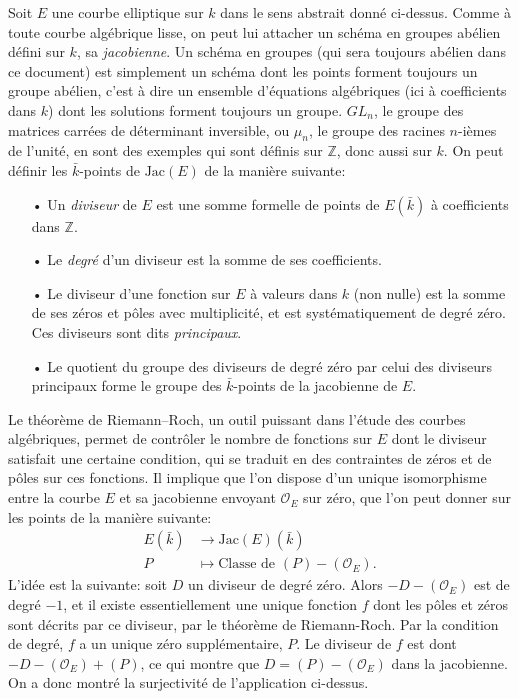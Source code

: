 \documentclass[11pt,a4paper]{article}
\newcommand{\Z}{\mathbb{Z}}
\renewcommand{\O}{\mathcal{O}}
\newcommand{\vers}{\longrightarrow}
\newcommand{\Jac}{\mathrm{Jac}}
\theoremstyle{definition}
\begin{document}
Soit $E$ une courbe elliptique sur $k$ dans le sens abstrait donné ci-dessus. Comme à toute courbe algébrique lisse, on peut lui attacher un schéma en groupes abélien défini sur $k$, sa \emph{jacobienne}. Un schéma en groupes (qui sera toujours abélien dans ce document) est simplement un schéma dont les points forment toujours un groupe abélien, c'est à dire un ensemble d'équations algébriques (ici à coefficients dans $k$) dont les solutions forment toujours un groupe. $GL_n$, le groupe des matrices carrées de déterminant inversible, ou $\mu_n$, le groupe des racines $n$-ièmes de l'unité, en sont des exemples qui sont définis sur $\Z$, donc aussi sur $k$. On peut définir les $\bar{k}$-points de $\Jac(E)$ de la manière suivante:
\begin{itemize}
\item[•] Un \emph{diviseur} de $E$ est une somme formelle de points de $E(\bar{k})$ à coefficients dans $\Z$.
\item[•] Le \emph{degré} d'un diviseur est la somme de ses coefficients.
\item[•] Le diviseur d'une fonction sur $E$ à valeurs dans $k$ (non nulle) est la somme de ses zéros et pôles avec multiplicité, et est systématiquement de degré zéro. Ces diviseurs sont dits \emph{principaux}.
\item[•] Le quotient du groupe des diviseurs de degré zéro par celui des diviseurs principaux forme le groupe des $\bar{k}$-points de la jacobienne de $E$.
\end{itemize}
Le théorème de Riemann--Roch, un outil puissant dans l'étude des courbes algébriques, permet de contrôler le nombre de fonctions sur $E$ dont le diviseur satisfait une certaine condition, qui se traduit en des contraintes de zéros et de pôles sur ces fonctions. Il implique que l'on dispose d'un unique isomorphisme entre la courbe $E$ et sa jacobienne envoyant $\O_E$ sur zéro, que l'on peut donner sur les points de la manière suivante:
$$\begin{aligned}
E(\bar{k}) &\vers \Jac(E)(\bar{k}) \\
P &\longmapsto \text{Classe de } (P) - (\O_E).
\end{aligned}$$
L'idée est la suivante: soit $D$ un diviseur de degré zéro. Alors $-D - (\O_E)$ est de degré $-1$, et il existe essentiellement une unique fonction $f$ dont les pôles et zéros sont décrits par ce diviseur, par le théorème de Riemann-Roch. Par la condition de degré, $f$ a un unique zéro supplémentaire, $P$. Le diviseur de $f$ est dont $- D - (\O_E) + (P)$, ce qui montre que $D = (P) - (\O_E)$ dans la jacobienne. On a donc montré la surjectivité de l'application ci-dessus.
\end{document}
